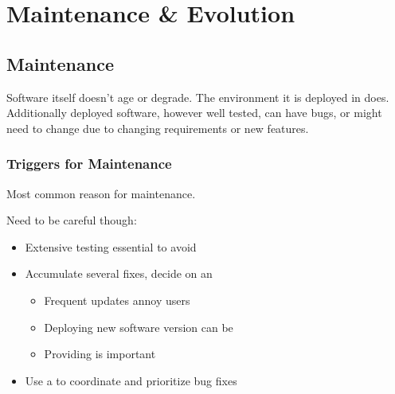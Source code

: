 \documentclass[
    ../../Software_Engineering_Summary.tex,
]
{subfiles}
\begin{document}
\section{Maintenance \& Evolution}
\subsection{Maintenance}
Software itself doesn't age or degrade. The environment it is deployed in does. Additionally deployed software, however well tested, can have bugs, or might need to change due to changing requirements or new features.

\subsubsection{Triggers for Maintenance}
\begin{defbox}
	Most common reason for maintenance. 

    Need to be careful though:
    \begin{itemize}
        \item Extensive testing essential to avoid 
        \item Accumulate several fixes, decide on an 
        \begin{itemize}
            \item Frequent updates annoy users
            \item Deploying new software version can be 
            \item Providing  is important
        \end{itemize}
        \item Use a  to coordinate and prioritize bug fixes
    \end{itemize}
\end{defbox}
\end{document}

